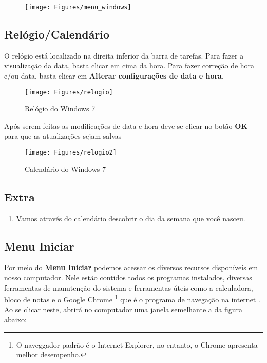 \documentclass[hidelinks,12pt]{article}
\begin{document}
		\begin{figure}[!h]
			\centering
			\texttt{[image: Figures/menu\_windows]}
			\label{fig:menu_windows}

		\end{figure}
  \newpage
  \subsection{Relógio/Calendário}

	O relógio está localizado na direita inferior da barra de tarefas. Para fazer a visualização da data, basta clicar em cima da hora. Para fazer correção de hora e/ou data, basta clicar em {\bf Alterar configurações de data e hora}.

	\begin{figure}[!hb]
		\centering
		\texttt{[image: Figures/relogio]}
		\caption{Relógio do Windows 7}
		\label{fig:relogio}

	\end{figure}

	Após serem feitas as modificações de data e hora deve-se clicar no botão {\bf OK} para que as atualizações sejam salvas

	\begin{figure}[!h]
		\centering
		\texttt{[image: Figures/relogio2]}
		\caption{Calendário do Windows 7}
		\label{fig:calendario}

	\end{figure}

	\newpage

	\subsection{Extra}
	\begin{enumerate}
		\item Vamos através do calendário descobrir o dia da semana que você nasceu.
	\end{enumerate}


	\subsection{Menu Iniciar}

	Por meio do \textbf{Menu Iniciar} podemos acessar os diversos recursos disponíveis em nosso computador. Nele estão contidos todos os programas instalados, diversas ferramentas de manutenção do sistema e ferramentas úteis como a calculadora, bloco de notas e o Google Chrome \footnote{O naveggador padrão é o Internet Explorer, no entanto, o Chrome apresenta melhor desempenho.} que é o programa de navegação na internet . Ao se clicar neste, abrirá no computador uma janela semelhante a da figura abaixo:
\end{document}
